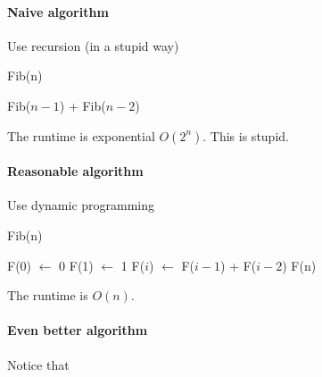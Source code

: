             \paragraph{Naive algorithm}
                Use recursion (in a stupid way)
                \begin{algorithm}[H]
                    \caption{Fib(n)}
                    \begin{algorithmic}[1]
                            \State {}
                        \EndIf
                            \State {}
                        \EndIf
                        \State \Return Fib($n - 1$) + Fib($n - 2$)
                    \end{algorithmic}
                \end{algorithm}

                The runtime is exponential $O(2^n)$. This is stupid.

            \paragraph{Reasonable algorithm}
                Use dynamic programming
                \begin{algorithm}[H]
                    \caption{Fib(n)}
                    \begin{algorithmic}[1]
                        \State F(0) $\gets$ 0
                        \State F(1) $\gets$ 1
                            \State F($i$) $\gets$ F($i - 1$) + F($i - 2$)
                        \EndFor
                        \State \Return F(n)
                    \end{algorithmic}
                \end{algorithm}

                The runtime is $O(n)$.

            \paragraph{Even better algorithm}
                
                Notice that


